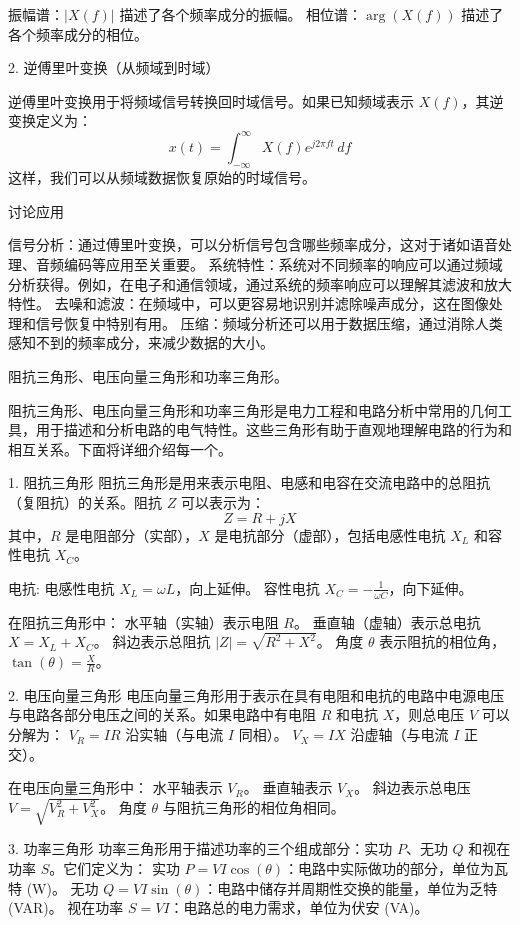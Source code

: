 \documentclass[dvipsnames, svgnames,a4paper,11pt]{article}
\begin{document}
		振幅谱：\( |X(f)| \) 描述了各个频率成分的振幅。
		相位谱：\( \arg(X(f)) \) 描述了各个频率成分的相位。
		
		2. 逆傅里叶变换（从频域到时域）
		
		逆傅里叶变换用于将频域信号转换回时域信号。如果已知频域表示 \(X(f)\)，其逆变换定义为：
		\[ x(t) = \int_{-\infty}^\infty X(f) e^{j 2\pi ft} \, df \]
		这样，我们可以从频域数据恢复原始的时域信号。
		
		讨论应用
		
		信号分析：通过傅里叶变换，可以分析信号包含哪些频率成分，这对于诸如语音处理、音频编码等应用至关重要。
		系统特性：系统对不同频率的响应可以通过频域分析获得。例如，在电子和通信领域，通过系统的频率响应可以理解其滤波和放大特性。
		去噪和滤波：在频域中，可以更容易地识别并滤除噪声成分，这在图像处理和信号恢复中特别有用。
		压缩：频域分析还可以用于数据压缩，通过消除人类感知不到的频率成分，来减少数据的大小。
		
		\begin{question}
			阻抗三角形、电压向量三角形和功率三角形。
		\end{question}
		阻抗三角形、电压向量三角形和功率三角形是电力工程和电路分析中常用的几何工具，用于描述和分析电路的电气特性。这些三角形有助于直观地理解电路的行为和相互关系。下面将详细介绍每一个。
		
		1. 阻抗三角形
		阻抗三角形是用来表示电阻、电感和电容在交流电路中的总阻抗（复阻抗）的关系。阻抗 \( Z \) 可以表示为：
		\[ Z = R + jX \]
		其中，\( R \) 是电阻部分（实部），\( X \) 是电抗部分（虚部），包括电感性电抗 \( X_L \) 和容性电抗 \( X_C \)。
		
		电抗:
		电感性电抗 \( X_L = \omega L \)，向上延伸。
		容性电抗 \( X_C = -\frac{1}{\omega C} \)，向下延伸。
		
		在阻抗三角形中：
		水平轴（实轴）表示电阻 \( R \)。
		垂直轴（虚轴）表示总电抗 \( X = X_L + X_C \)。
		斜边表示总阻抗 \( |Z| = \sqrt{R^2 + X^2} \)。
		角度 \( \theta \) 表示阻抗的相位角，\( \tan(\theta) = \frac{X}{R} \)。
		
		2. 电压向量三角形
		电压向量三角形用于表示在具有电阻和电抗的电路中电源电压与电路各部分电压之间的关系。如果电路中有电阻 \( R \) 和电抗 \( X \)，则总电压 \( V \) 可以分解为：
		\( V_R = IR \) 沿实轴（与电流 \( I \) 同相）。
		\( V_X = IX \) 沿虚轴（与电流 \( I \) 正交）。
		
		在电压向量三角形中：
		水平轴表示 \( V_R \)。
		垂直轴表示 \( V_X \)。
		斜边表示总电压 \( V = \sqrt{V_R^2 + V_X^2} \)。
		角度 \( \theta \) 与阻抗三角形的相位角相同。
		
		3. 功率三角形
		功率三角形用于描述功率的三个组成部分：实功 \( P \)、无功 \( Q \) 和视在功率 \( S \)。它们定义为：
		实功 \( P = VI \cos(\theta) \)：电路中实际做功的部分，单位为瓦特 (W)。
		无功 \( Q = VI \sin(\theta) \)：电路中储存并周期性交换的能量，单位为乏特 (VAR)。
		视在功率 \( S = VI \)：电路总的电力需求，单位为伏安 (VA)。
		
\end{document}

